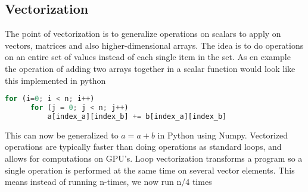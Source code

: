 \subsection{Vectorization}
\label{subsec:vectorization}

The point of vectorization is to generalize operations on scalars to apply on vectors, matrices and also higher-dimensional arrays. The idea is to do operations on an entire set of values instead of each single item in the set. As en example the operation of adding two arrays together in a scalar function would look like this implemented in python
\begin{lstlisting}[language=Python]
  for (i=0; i < n; i++)
      for (j = 0; j < n; j++)
          a[index_a][index_b] += b[index_a][index_b]
\end{lstlisting}

This can now be generalized to $a=a+b$ in Python using Numpy. Vectorized operations are typically faster than doing operations as standard loops, and allows for computations on GPU's. Loop vectorization transforms a program so a single operation is performed at the same time on several vector elements. This means instead of running n-times, we now run n/4 times

